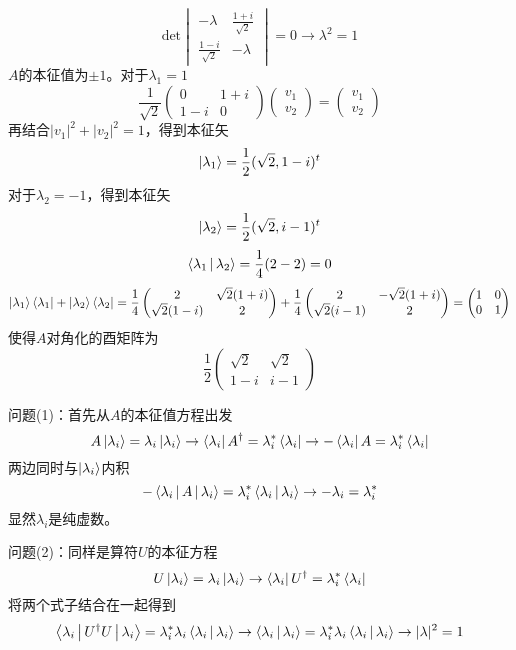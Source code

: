 \exercise
\[
\text{det}
\begin{vmatrix}
-\lambda & \frac{1+i}{\sqrt{2}} \\ \frac{1-i}{\sqrt{2}} & -\lambda
\end{vmatrix}
= 0 \rightarrow \lambda^2 = 1
\]
$A$的本征值为$\pm 1$。对于$\lambda_1=1$
\[
\frac{1}{\sqrt{2}}
\begin{pmatrix}
0 & 1+i \\ 1-i & 0
\end{pmatrix}
\begin{pmatrix}
v_1 \\ v_2
\end{pmatrix}
=
\begin{pmatrix}
v_1 \\ v_2
\end{pmatrix}
\]
再结合$|v_1|^2+|v_2|^2=1$，得到本征矢
\[
\ket{\lambda_1} = \frac{1}{2}(\sqrt{2}, 1-i)^t
\]
对于$\lambda_2=-1$，得到本征矢
\[
\ket{\lambda_2} = \frac{1}{2}(\sqrt{2}, i-1)^t
\]
\[
\Braket{\lambda_1|\lambda_2} = \frac14 (2-2) = 0
\]
\[
\ket{\lambda_1}\bra{\lambda_1} + \ket{\lambda_2}\bra{\lambda_2} = \frac14
\begin{pmatrix}
2 & \sqrt{2}(1+i) \\ \sqrt{2}(1-i) & 2
\end{pmatrix}
+ \frac14
\begin{pmatrix}
2 & -\sqrt{2}(1+i) \\ \sqrt{2}(i-1) & 2
\end{pmatrix}
=
\begin{pmatrix}
1 & 0 \\ 0 & 1
\end{pmatrix}
\]
使得$A$对角化的酉矩阵为
\[
\frac12
\begin{pmatrix}
\sqrt{2} & \sqrt{2} \\
1-i & i - 1
\end{pmatrix}
\]

\exercise

问题(1)：首先从$A$的本征值方程出发
\[
A\ket{\lambda_i} = \lambda_i\ket{\lambda_i} \rightarrow \bra{\lambda_i}A^\dagger = \lambda_i^*\bra{\lambda_i} \rightarrow -\bra{\lambda_i}A = \lambda_i^*\bra{\lambda_i}
\]
两边同时与$\ket{\lambda_i}$内积
\[
-\Braket{\lambda_i|A|\lambda_i} = \lambda_i^*\Braket{\lambda_i|\lambda_i} \rightarrow -\lambda_i = \lambda_i^*
\]
显然$\lambda_i$是纯虚数。


问题(2)：同样是算符$U$的本征方程
\[
U\ket{\lambda_i} = \lambda_i\ket{\lambda_i} \rightarrow \bra{\lambda_i}U^\dagger = \lambda_i^*\bra{\lambda_i}
\]
将两个式子结合在一起得到
\[
\Braket{\lambda_i|U^\dagger U|\lambda_i} = \lambda_i^*\lambda_i\Braket{\lambda_i|\lambda_i} \rightarrow \Braket{\lambda_i|\lambda_i} = \lambda_i^*\lambda_i\Braket{\lambda_i|\lambda_i} \rightarrow |\lambda|^2 = 1
\]

